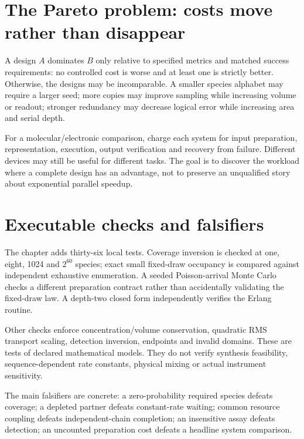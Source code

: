 \section{The Pareto problem: costs move rather than disappear}
A design $A$ dominates $B$ only relative to specified metrics and matched success
requirements: no controlled cost is worse and at least one is strictly better.
Otherwise, the designs may be incomparable.
A smaller species alphabet may require a larger seed; more copies may improve
sampling while increasing volume or readout; stronger redundancy may decrease
logical error while increasing area and serial depth.


For a molecular/electronic comparison, charge each system for input preparation,
representation, execution, output verification and recovery from failure.
Different devices may still be useful for different tasks. The goal is to discover
the workload where a complete design has an advantage, not to preserve an
unqualified story about exponential parallel speedup.

\section{Executable checks and falsifiers}
The chapter adds thirty-six local tests. Coverage inversion is checked at one,
eight, 1024 and $2^{60}$ species; exact small fixed-draw occupancy is compared
against independent exhaustive enumeration. A seeded Poisson-arrival Monte Carlo
checks a different preparation contract rather than accidentally validating the
fixed-draw law. A depth-two closed form independently verifies the Erlang routine.

Other checks enforce concentration/volume conservation, quadratic RMS transport
scaling, detection inversion, endpoints and invalid domains. These are tests of
declared mathematical models. They do not verify synthesis feasibility,
sequence-dependent rate constants, physical mixing or actual instrument sensitivity.

The main falsifiers are concrete: a zero-probability required species defeats
coverage; a depleted partner defeats constant-rate waiting; common resource
coupling defeats independent-chain completion; an insensitive assay defeats
detection; an uncounted preparation cost defeats a headline system comparison.

